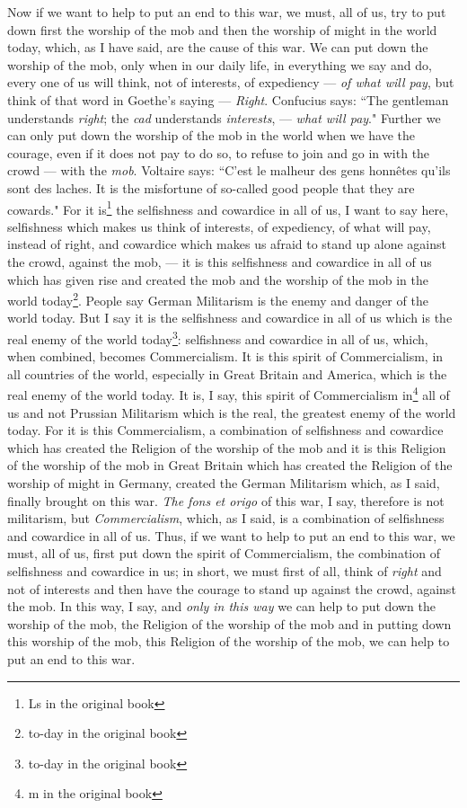 Now if we want to help to put an end to this war, we must, all of us, try to put down first the worship of the mob and then the worship of might in the world today, which, as I have said, are the cause of this war.
We can put down the worship of the mob, only when in our daily life, in everything we say and do, every one of us will think, not of interests, of expediency --- \emph{of what will pay}, but think of that word in Goethe's saying --- \emph{Right}.
Confucius says: ``The gentleman understands \emph{right}; the \emph{cad} understands \emph{interests}, --- \emph{what will pay}."
Further we can only put down the worship of the mob in the world when we have the courage, even if it does not pay to do so, to refuse to join and go in with the crowd --- with the \emph{mob}.
Voltaire  says: ``C'est le malheur des gens honn\^etes qu'ils sont des laches.
It is the misfortune of so-called good people that they are cowards."
For it is\footnote{Ls in the original book} the selfishness and cowardice in all of us, I want to say here, selfishness which makes us think of interests, of expediency, of what will pay, instead of right, and cowardice which makes us afraid to stand up alone against the crowd, against the mob, --- it is this selfishness and cowardice in all of us which has given rise and created the mob and the worship of the mob in the world today\footnote{to-day   in the original book}.
People say German Militarism is the enemy and danger of the world today.
But I say it is the selfishness and cowardice in all of us which is the real enemy of the world today\footnote{to-day in the original book}: selfishness and cowardice in all of us, which, when combined, becomes Commercialism.
It is this spirit of Commercialism, in all countries of the world, especially in Great Britain and America, which is the real enemy of the world today. 
It is, I say, this spirit of Commercialism in\footnote{m in the original book} all of us and not Prussian Militarism which is the real, the greatest enemy of the world today.
For it is this Commercialism, a combination of selfishness and cowardice which has created the Religion of the worship of the mob and it is this Religion of the worship of the mob in Great Britain which has created the Religion of the worship of might in Germany, created the German Militarism which, as I said, finally brought on this war.
\emph{The fons et origo} of this war, I say, therefore is not militarism, but \emph{Commercialism}, which, as I said, is a combination of selfishness and cowardice in all of us.
Thus, if we want to help to put an end to this war, we must, all of us, first put down the spirit of Commercialism, the combination of selfishness and cowardice in us; in short, we must first of all, think of \emph{right} and not of interests and then have the courage to stand up against the crowd, against the mob.
In this way, I say, and \emph{only in this way} we can help to put down the worship of the mob, the Religion of the worship of the mob and in putting down this worship of the mob, this Religion of the worship of the mob, we can help to put an end to this war.

